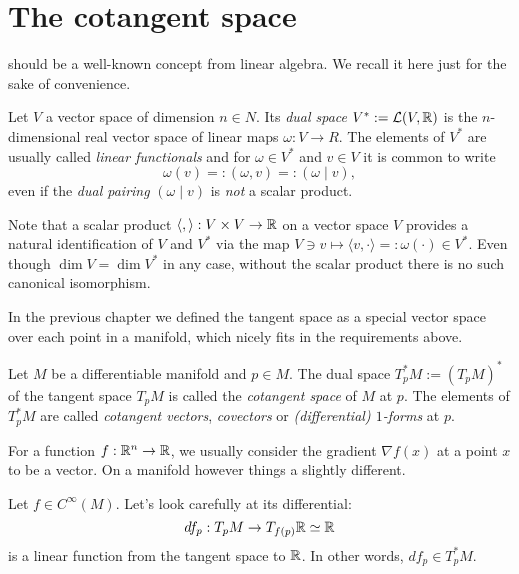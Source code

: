 \section{The cotangent space}

 should be a well-known concept from linear algebra. We recall it here just for the sake of convenience.

\begin{definition}
  Let $V$ a vector space of dimension $n\in N$.
  Its \emph{dual space} $V^* := \mathcal{L}(V, \mathbb{R})$ is the $n$-dimensional real vector space of linear maps $\omega:V \to R$.
  The elements of $V^*$ are usually called \emph{linear functionals} and for $\omega\in V^*$ and $v\in V$ it is common to write
  \begin{equation}
    \omega(v) =: (\omega, v) =: (\omega \mid v),
  \end{equation}
  even if the \emph{dual pairing} $(\omega \mid v)$ is \emph{not} a scalar product.
\end{definition}

\begin{remark}\label{rmk:identification}
  Note that a scalar product $\langle,\rangle :  V\times V \to \mathbb{R}$ on a vector space $V$ provides a natural identification of $V$ and $V^*$ via the map $V\ni v \mapsto \langle v, \cdot \rangle =: \omega(\cdot) \in V^*$.
  Even though $\dim V = \dim V^*$ in any case, without the scalar product there is no such canonical isomorphism.
\end{remark}

In the previous chapter we defined the tangent space as a special vector space over each point in a manifold, which nicely fits in the requirements above.

\begin{definition}
  Let $M$ be a differentiable manifold and $p\in M$.
  The dual space $T_p^*M := (T_pM)^*$ of the tangent space $T_pM$ is called the \emph{cotangent space} of $M$ at $p$.
  The elements of $T^*_pM$ are called \emph{cotangent vectors}, \emph{covectors} or \emph{(differential) $1$-forms} at $p$.
\end{definition}

For a function $f:\mathbb{R}^n\to\mathbb{R}$, we usually consider the gradient $\nabla f(x)$ at a point $x$ to be a vector.
On a manifold however things a slightly different.

\begin{example}
  Let $f\in C^\infty(M)$.
  Let's look carefully at its differential:
  \begin{equation}
    df_p: T_p M \to T_{f(p)}\mathbb{R} \simeq \mathbb{R}
  \end{equation}
  is a linear function from the tangent space to $\mathbb{R}$.
  In other words, $df_p \in T_p^* M$.
\end{example}


